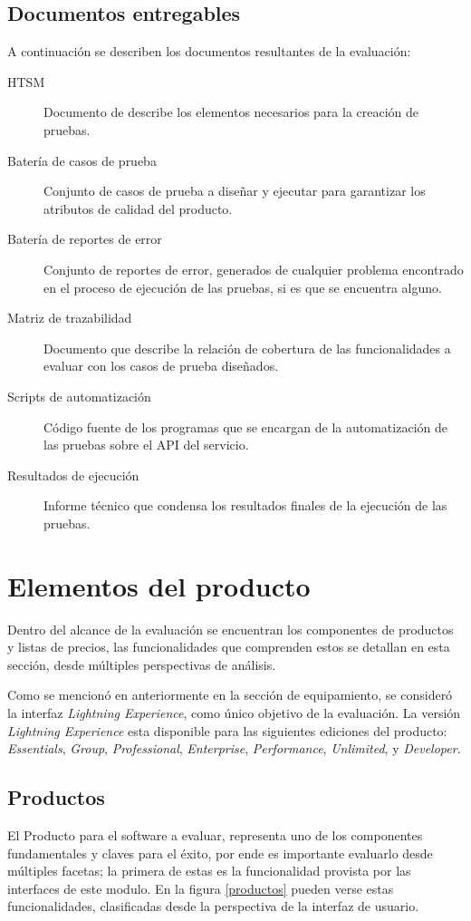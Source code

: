 \subsection{Documentos entregables}
A continuación se describen los documentos resultantes de la evaluación:

\begin{description}
\item [HTSM] Documento de describe los elementos necesarios para la creación de
    pruebas.
\item [Batería de casos de prueba] Conjunto de casos de prueba a diseñar y
    ejecutar para garantizar los atributos de calidad del producto.
\item [Batería de reportes de error] Conjunto de reportes de error, generados de
    cualquier problema encontrado en el proceso de ejecución de las pruebas, si
    es que se encuentra alguno.
\item [Matriz de trazabilidad] Documento que describe la relación de cobertura
    de las funcionalidades a evaluar con los casos de prueba diseñados.
\item [Scripts de automatización] Código fuente de los programas que se encargan
    de la automatización de las pruebas sobre el API del servicio.
\item [Resultados de ejecución] Informe técnico que condensa los resultados
    finales de la ejecución de las pruebas.
\end{description}

\section{Elementos del producto}
Dentro del alcance de la evaluación se encuentran los componentes de productos
y listas de precios, las funcionalidades que comprenden estos se detallan en
esta sección, desde múltiples perspectivas de análisis.

Como se mencionó en anteriormente en la sección de equipamiento, se consideró la
interfaz \emph{Lightning Experience}, como único objetivo de la evaluación. La
versión \emph{Lightning Experience} esta disponible para las siguientes
ediciones del producto: \emph{Essentials}, \emph{Group}, \emph{Professional},
\emph{Enterprise}, \emph{Performance}, \emph{Unlimited}, y \emph{Developer}.

\subsection{Productos}
El Producto para el software a evaluar, representa uno de los componentes
fundamentales y claves para el éxito, por ende es importante evaluarlo
desde múltiples facetas; la primera de estas es la funcionalidad provista por
las interfaces de este modulo. En la figura \ref{productos} pueden verse estas
funcionalidades, clasificadas desde la perspectiva de la interfaz de usuario.

